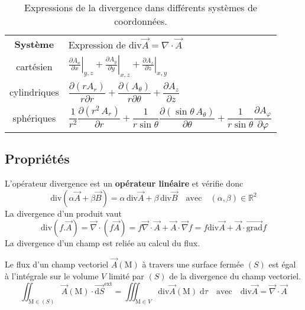 \begin{table}[htbp]
\centering
\footnotesize
\begin{tabular}{c|l}
	\toprule
	\textbf{Système}	& Expression de $\text{div}\overrightarrow{A}=\nabla\cdot\overrightarrow{A}$\\[4mm]
	cartésien		& $ \left.\frac{\partial A_x}{\partial x}\right|_{y,z}
+ \left.\frac{\partial A_y}{\partial y}\right|_{x,z}
+\left.\frac{\partial A_z}{\partial z}\right|_{x,y}$\\[4mm]
	cylindriques		& $\dfrac{\partial(r A_{r})}{r\partial r}+ \dfrac{\partial(A_{\theta})}{r\partial \theta} + \dfrac{\partial A_{z}}{\partial z}$\\[4mm]
	sphériques			& $\dfrac{1}{r^{2}}\dfrac{\partial(r^{2}\,A_{r})}{\partial r} +  \dfrac{1}{r\sin\theta}\dfrac{\partial(\sin\theta\,A_{\theta})}{\partial \theta} + \dfrac{1}{r\sin\theta}\dfrac{\partial A_{\varphi}}{\partial \varphi}$ \\
	\bottomrule
\end{tabular}
\caption{Expressions de la divergence dans différents systèmes de coordonnées.}
\end{table}

\subsection{Propriétés}
L'opérateur divergence est un  \textbf{opérateur linéaire} et vérifie donc 
\[
	\text{div}(\alpha \overrightarrow{A}+\beta \overrightarrow{B})=\alpha\,\text{div}\overrightarrow{A}+
	\beta\,\text{div}\overrightarrow{B}
	\quad\text{avec}\quad	(\alpha,\beta)\in\mathbb{R}^2
\]
La divergence d'un produit vaut
\[
	\text{div}(f.\overrightarrow{A}) = \overrightarrow{\nabla}\cdot(f\overrightarrow{A}) = f\overrightarrow{\nabla}\cdot\overrightarrow{A}+\overrightarrow{A}\cdot\overrightarrow{\nabla}f = f\text{div}\overrightarrow{A}+\overrightarrow{A}\cdot\overrightarrow{\text{grad}}f
\]
La divergence d'un champ est reliée au calcul du flux.
\begin{kaobox}[frametitle=Théorème de Green-Ostrogradsky ou théorème de la divergence]
Le flux d'un champ vectoriel $\overrightarrow{A}(\textrm{M})$ à travers une surface fermée $(S)$ est égal à l'intégrale sur le volume $V$ limité par $(S)$ de la divergence du champ vectoriel. 
\[
\iint_{\textrm{M}\in (S)}\overrightarrow{A}(\textrm{M})\cdot\overrightarrow{\textrm{d}S}^{\textrm{ext}}=
\iiint_{\textrm{M}\in V}\text{div}\overrightarrow{A}(\textrm{M})\;\text{d}\tau
\quad\textrm{avec}\quad
\textrm{div}\overrightarrow{A}=\overrightarrow{\nabla}\cdot\overrightarrow{A}\]
\end{kaobox} 

